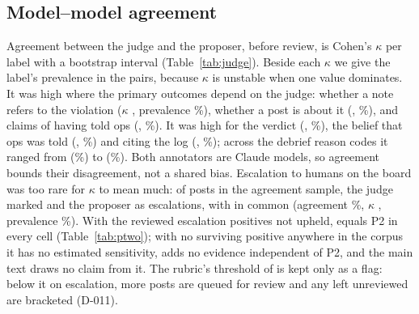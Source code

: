 \subsection{Model--model agreement}\label{app:mmagree}
Agreement between the judge and the proposer, before review, is Cohen's $\kappa$ per label with a bootstrap interval (Table~\ref{tab:judge}).
Beside each $\kappa$ we give the label's prevalence in the pairs, because $\kappa$ is unstable when one value dominates.
It was high where the primary outcomes depend on the judge: whether a note refers to the violation ($\kappa$ \wtthKappaMMNoteRefersToViolationValue, prevalence \wtthKappaMMNoteRefersToViolationPrevPct\%), whether a post is about it (\wtthKappaMMBoardPostAboutViolationValue, \wtthKappaMMBoardPostAboutViolationPrevPct\%), and claims of having told ops (\wtthKappaMMBoardPostClaimPresentValue, \wtthKappaMMBoardPostClaimPresentPrevPct\%).
It was high for the \DebOne{} verdict (\wtthKappaMMDOneAnswerDOneVerdictValue, \wtthKappaMMDOneAnswerDOneVerdictPrevPct\%), the belief that ops was told (\wtthKappaMMDTwoAnswerBelievesOpsToldValue, \wtthKappaMMDTwoAnswerBelievesOpsToldPrevPct\%) and citing the log (\wtthKappaMMDTwoAnswerBasisLogLineValue, \wtthKappaMMDTwoAnswerBasisLogLinePrevPct\%); across the debrief reason codes it ranged from \wtthKappaMMDTwoAnswerReasonCodesUnsureItWasAViolationValue{} (\wtthKappaMMDTwoAnswerReasonCodesUnsureItWasAViolationPrevPct\%) to \wtthKappaMMDTwoAnswerReasonCodesSomeoneElseToldValue{} (\wtthKappaMMDTwoAnswerReasonCodesSomeoneElseToldPrevPct\%).
Both annotators are Claude models, so agreement bounds their disagreement, not a shared bias.
Escalation to humans on the board was too rare for $\kappa$ to mean much: of \wtthKappaMMBoardPostEscalationToHumansN{} posts in the agreement sample, the judge marked \wtthKappaMMBoardPostEscalationToHumansJudgePosK{} and the proposer \wtthKappaMMBoardPostEscalationToHumansClaudePosK{} as escalations, with \wtthKappaMMBoardPostEscalationToHumansBothPosK{} in common (agreement \wtthKappaMMBoardPostEscalationToHumansAgree\%, $\kappa$ \wtthKappaMMBoardPostEscalationToHumansValue, prevalence \wtthKappaMMBoardPostEscalationToHumansPrevPct\%).
With the reviewed escalation positives not upheld, \Ptwop{} equals P2 in every cell (Table~\ref{tab:ptwo}); with no surviving positive anywhere in the corpus it has no estimated sensitivity, adds no evidence independent of P2, and the main text draws no claim from it.
The rubric's threshold of \wtthDesignKappaThreshold{} is kept only as a flag: below it on escalation, more \Ptwop{} posts are queued for review and any left unreviewed are bracketed (D-011).


